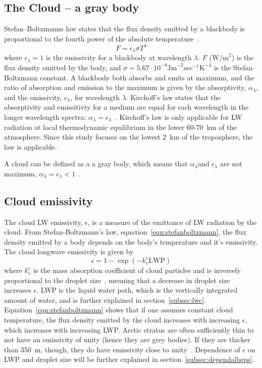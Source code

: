 \subsection{The Cloud -- a gray body}
Stefan–Boltzmanns law states that the flux density emitted by a blackbody is proportional to the fourth power of the absolute temperature~\citep{Liou2002}. 
\begin{equation}
F = \epsilon_{\lambda} \sigma T^4
\label{eqn:stefanboltzmann}
\end{equation}
where $\epsilon_{\lambda} = 1$ is the emissivity for a blackbody at wavelength $\lambda$. $F$ ($\text{W/m}^2$) is the flux density emitted  by the body, and $\sigma = 5.67\cdot 10^{-8} \text{Jm}^{-2}\text{sec}^{-1}\text{K}^{-4}$ is the Stefan–Boltzmann constant. A blackbody both absorbs and emits at maximum, and the ratio of absorption and emission to the maximum is given by the absorptivity, $\alpha_{\lambda}$, and the emissivity, $\epsilon_{\lambda}$, for wavelength $\lambda$. Kirchoff's law states that the absorptivity and emissitivty for a medium are equal for each wavelength in the longer wavelength spectra: $\alpha_{\lambda} = \epsilon_{\lambda}$~\citep{Liou2002}. Kirchoff's law is only applicable for LW radiation at local thermodynamic equilibrium in the lower 60-70~km of the atmosphere. Since this study focuses on the lowest 2~km of the troposphere, the law is applicable.

A cloud can be defined as a a gray body, which means that $\alpha_{\lambda}$and $\epsilon_{\lambda}$ are not maximum, $\alpha_{\lambda}=\epsilon_{\lambda}<1$~\citep{Liou2002}.

\subsection{Cloud emissivity}
The cloud LW emissivity, $\epsilon$, is a measure of the emittance of LW radiation by the cloud. From Stefan-Boltzmann's law, equation~\ref{eqn:stefanboltzmann}, the flux density emitted by a body depends on the body's temperature and it's emissivity. The cloud longwave emissivity is given by~\cite{Liou1992}
\begin{equation}
\epsilon = 1 - \exp(-k_v^c \text{LWP})
\label{eqn:epsilon_lw}
\end{equation}
where $k_v^c$ is the mass absorption coefficient of cloud particles and is inversely proportional to the droplet size~\citep{Alterskjaer2010}, meaning that a decrease in droplet size increases $\epsilon$. LWP is the liquid water path, which is the vertically integrated amount of water, and is further explained in section~\ref{subsec:lwc}. Equation~\ref{eqn:stefanboltzmann} shows that if one assumes constant cloud temperature, the flux density emitted by the cloud increases with increasing $\epsilon$, which increases with increasing LWP. Arctic stratus are often sufficiently thin to not have an emissivity of unity (hence they are grey bodies). If they are thicker than 350~m, though, they do have emissivity close to unity~\citep{Herman1980}. Dependence of $\epsilon$ on LWP and droplet size will be further explained in section~\ref{subsec:dependalbeps}.

